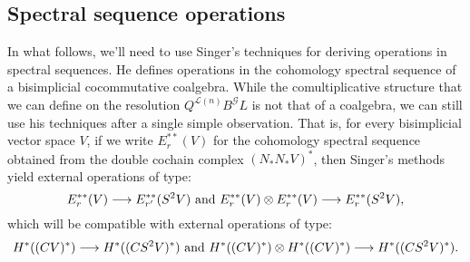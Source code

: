 \documentclass[11pt]{amsart}
\theoremstyle{plain}
\theoremstyle{definition}
\renewcommand{\to}{\longrightarrow}
\newcommand{\scrQ}{\mathscr{Q}}
\newcommand{\scrR}{\mathscr{R}}
\newcommand{\scrT}{\mathscr{T}}
\newcommand{\scrY}{\mathscr{Y}}
\newcommand{\scrI}{\mathscr{I}}
\newcommand{\scrO}{\mathscr{O}}
\newcommand{\scrP}{\mathscr{P}}
\newcommand{\scrS}{\mathscr{S}}
\newcommand{\scrG}{\mathscr{G}}
\newcommand{\scrH}{\mathscr{H}}
\newcommand{\scrJ}{\mathscr{J}}
\newcommand{\scrK}{\mathscr{K}}
\newcommand{\scrL}{\mathscr{L}}
\newcommand{\scrZ}{\mathscr{Z}}
\newcommand{\scrN}{\mathscr{N}}
\newcommand{\scrM}{\mathscr{M}}
\newcommand{\calL}{\mathcal{L}}
\theoremstyle{plain}
\newcommand{\BSW}{{\scrG}}%
\newcommand{\BSWres}{B^\BSW}%
\begin{document}
\begin{Composite functor spectral sequences}
\subsection{Spectral sequence operations}
In what follows, we'll need to use Singer's techniques for deriving operations in spectral sequences. He defines operations in the cohomology spectral sequence of a bisimplicial cocommutative coalgebra. While the comultiplicative structure that we can define on the resolution $Q^{\calL(n)}\BSWres L$ is not that of a coalgebra, we can still use his techniques after a single simple observation. That is, for every bisimplicial vector space $V$, if we write $E_r^{**}(V)$ for the cohomology spectral sequence obtained from the double cochain complex $(N_*N_*V)^*$, then Singer's methods yield external operations of type:
\[E_r^{**}(V)\to E_{r'}^{**}(S^2V)\textup{ and }E_r^{**}(V)\otimes E_r^{**}(V)\to E_r^{**}(S^2V),\]
which will be compatible with external operations of type:
\[H^{*}((CV)^*)\to H^{*}((CS^2V)^*)\textup{ and }H^{*}((CV)^*)\otimes H^{*}((CV)^*)\to H^{*}((CS^2V)^*).\]


\end{Composite functor spectral sequences}
\end{document}
